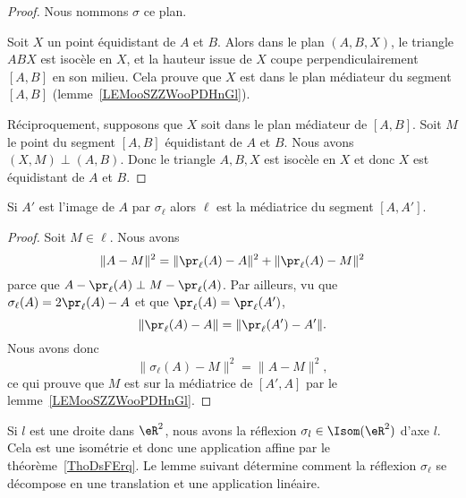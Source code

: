 \begin{proof}
	Nous nommons \( \sigma\) ce plan.

	Soit \( X\) un point équidistant de \( A\) et \( B\). Alors dans le plan \( (A,B,X)\), le triangle \( ABX\) est isocèle en \( X\), et la hauteur issue de \( X\) coupe perpendiculairement \( [A,B]\) en son milieu. Cela prouve que \( X\) est dans le plan médiateur du segment \( [A,B]\) (lemme~\ref{LEMooSZZWooPDHnGl}).

	Réciproquement, supposons que \( X\) soit dans le plan médiateur de \( [A,B]\). Soit \( M\) le point du segment \( [A,B]\) équidistant de \( A\) et \( B\). Nous avons \( (X,M)\perp (A,B)\). Donc le triangle \( A,B,X\) est isocèle en \( X\) et donc \( X\) est équidistant de \( A\) et \( B\).
\end{proof}

\begin{lemma}       \label{LEMooTCIEooXdyuHu}
	Si \( A'\) est l'image de \( A\) par \( \sigma_{\ell}\) alors \( \ell\) est la médiatrice du segment \( [A,A']\).
\end{lemma}

\begin{proof}
	Soit \( M\in\ell\). Nous avons
	\begin{equation}
		\| A-M \|^2=\| \pr_{\ell}(A)-A \|^2+\| \pr_{\ell}(A)-M \|^2
	\end{equation}
	parce que \( A-\pr_{\ell}(A)\perp M-\pr_{\ell}(A)\). Par ailleurs, vu que \( \sigma_{\ell}(A)=2\pr_{\ell}(A)-A\) et que \( \pr_{\ell}(A)=\pr_{\ell}(A')\),
	\begin{equation}
		\| \pr_{\ell}(A)-A \|=\| \pr_{\ell}(A')-A' \|.
	\end{equation}
	Nous avons donc
	\begin{equation}
		\| \sigma_{\ell}(A)-M \|^2=\| A-M \|^2,
	\end{equation}
	ce qui prouve que \( M\) est sur la médiatrice de \( [A',A]\) par le lemme~\ref{LEMooSZZWooPDHnGl}.
\end{proof}

\begin{normaltext}
	Si \( l\) est une droite dans \( \eR^2\), nous avons la réflexion \( \sigma_l\in\Isom(\eR^2)\) d'axe \( l\). Cela est une isométrie et donc une application affine par le théorème~\ref{ThoDsFErq}. Le lemme suivant détermine comment la réflexion \( \sigma_{\ell}\) se décompose en une translation et une application linéaire.
\end{normaltext}

